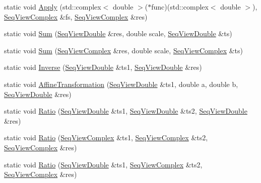 \begin{Indent}
\begin{DoxyCompactItemize}
\item 
static void \hyperlink{classtsa_1_1_view_util_a3c240b727d35554e0e2f59ae30ca776c}{Apply} (std\+::complex$<$ double $>$($\ast$func)(std\+::complex$<$ double $>$), \hyperlink{namespacetsa_ab32775c889b53c40fa83939f22372b75}{Seq\+View\+Complex} \&fs, \hyperlink{namespacetsa_ab32775c889b53c40fa83939f22372b75}{Seq\+View\+Complex} \&res)
\item 
static void \hyperlink{classtsa_1_1_view_util_a9e41750dd9f5f087db64175b4a50f87d}{Sum} (\hyperlink{namespacetsa_ac599574bcc094eda25613724b8f3ca9e}{Seq\+View\+Double} \&res, double scale, \hyperlink{namespacetsa_ac599574bcc094eda25613724b8f3ca9e}{Seq\+View\+Double} \&ts)
\item 
static void \hyperlink{classtsa_1_1_view_util_a9647a25c2db49cdd25b864f4465491f1}{Sum} (\hyperlink{namespacetsa_ab32775c889b53c40fa83939f22372b75}{Seq\+View\+Complex} \&res, double scale, \hyperlink{namespacetsa_ab32775c889b53c40fa83939f22372b75}{Seq\+View\+Complex} \&ts)
\item 
static void \hyperlink{classtsa_1_1_view_util_a39c49e23ff6a7ea64aa1ced4fc453c53}{Inverse} (\hyperlink{namespacetsa_ac599574bcc094eda25613724b8f3ca9e}{Seq\+View\+Double} \&ts1, \hyperlink{namespacetsa_ac599574bcc094eda25613724b8f3ca9e}{Seq\+View\+Double} \&res)
\item 
static void \hyperlink{classtsa_1_1_view_util_a41ec224b9de8ca38affb8a83589c93c7}{Affine\+Transformation} (\hyperlink{namespacetsa_ac599574bcc094eda25613724b8f3ca9e}{Seq\+View\+Double} \&ts1, double a, double b, \hyperlink{namespacetsa_ac599574bcc094eda25613724b8f3ca9e}{Seq\+View\+Double} \&res)
\item 
static void \hyperlink{classtsa_1_1_view_util_a7472defdb289abc1904d985e284d51a7}{Ratio} (\hyperlink{namespacetsa_ac599574bcc094eda25613724b8f3ca9e}{Seq\+View\+Double} \&ts1, \hyperlink{namespacetsa_ac599574bcc094eda25613724b8f3ca9e}{Seq\+View\+Double} \&ts2, \hyperlink{namespacetsa_ac599574bcc094eda25613724b8f3ca9e}{Seq\+View\+Double} \&res)
\item 
static void \hyperlink{classtsa_1_1_view_util_a64ba1355162435b8ac44936c5957f2b8}{Ratio} (\hyperlink{namespacetsa_ab32775c889b53c40fa83939f22372b75}{Seq\+View\+Complex} \&ts1, \hyperlink{namespacetsa_ab32775c889b53c40fa83939f22372b75}{Seq\+View\+Complex} \&ts2, \hyperlink{namespacetsa_ab32775c889b53c40fa83939f22372b75}{Seq\+View\+Complex} \&res)
\item 
static void \hyperlink{classtsa_1_1_view_util_a93b25c30e8e78f0392eec2d09eb3e8fe}{Ratio} (\hyperlink{namespacetsa_ac599574bcc094eda25613724b8f3ca9e}{Seq\+View\+Double} \&ts1, \hyperlink{namespacetsa_ab32775c889b53c40fa83939f22372b75}{Seq\+View\+Complex} \&ts2, \hyperlink{namespacetsa_ab32775c889b53c40fa83939f22372b75}{Seq\+View\+Complex} \&res)

\end{DoxyCompactItemize}
\end{Indent}
